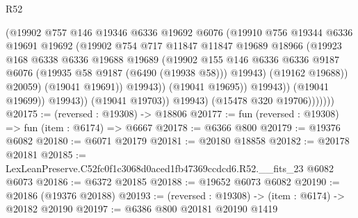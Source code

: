\begin{lexlean}{R52}
\begin{coremodule}
                                  (@19902
                                    @757
                                    @146
                                    @19346
                                    @6336
                                    @19692
                                    @6076
                                    (@19910
                                      @756
                                      @19344
                                      @6336
                                      @19691
                                      @19692
                                      (@19902
                                        @754
                                        @717
                                        @11847
                                        @11847
                                        @19689
                                        @18966
                                        (@19923
                                          @168
                                          @6338
                                          @6336
                                          @19688
                                          @19689
                                          (@19902
                                            @155
                                            @146
                                            @6336
                                            @6336
                                            @9187
                                            @6076
                                            (@19935 @58 @9187 (@6490 (@19938 @58)))
                                            @19943)
                                          (@19162 @19688))
                                        @20059)
                                      (@19041 @19691))
                                    @19943))
                                (@19041 @19695))
                              @19943))
                          (@19041 @19699))
                        @19943))
                    (@19041 @19703))
                  @19943)
                (@15478 @320 @19706)))))))
@20175 := (reversed : @19308) -> @18806
@20177 := fun (reversed : @19308) => fun (item : @6174) => @6667
@20178 := @6366 @800
@20179 := @19376 @6082
@20180 := @6071 @20179
@20181 := @20180 @18858
@20182 := @20178 @20181
@20185 := LexLeanPreserve.C52fc0f1c3068d0aced1fb47369ccdcd6.R52.__fits_23 @6082 @6073
@20186 := @6372 @20185
@20188 := @19652 @6073 @6082
@20190 := @20186 (@19376 @20188)
@20193 := (reversed : @19308) -> (item : @6174) -> @20182 @20190
@20197 := @6386 @800 @20181 @20190 @1419

\end{coremodule}
\end{lexlean}
